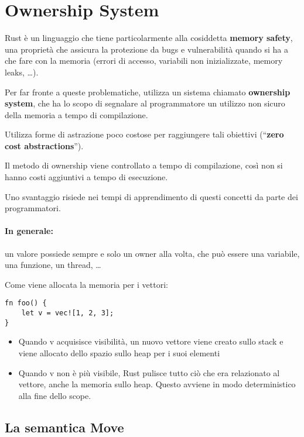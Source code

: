 \newpage
\section{Ownership System}
\label{sec:ownership}

Rust è un linguaggio che tiene particolarmente alla cosiddetta
\textbf{memory safety}, una proprietà che assicura la protezione da bugs e
vulnerabilità quando si ha a che fare con la memoria (errori di accesso,
variabili non inizializzate, memory leaks, \dots).

Per far fronte a queste problematiche, utilizza un sistema chiamato
\textbf{ownership system}, che ha lo scopo di segnalare al programmatore un
utilizzo non sicuro della memoria a tempo di compilazione.

Utilizza forme di astrazione poco costose per raggiungere tali obiettivi
(``\textbf{zero cost abstractions}'').

Il metodo di ownership viene controllato a tempo di compilazione, così non si
hanno costi aggiuntivi a tempo di esecuzione.

Uno svantaggio risiede nei tempi di apprendimento di questi concetti da parte
dei programmatori.

\paragraph{In generale:} un valore possiede sempre e solo un owner alla
volta, che può essere una variabile, una funzione, un thread, \dots

Come viene allocata la memoria per i vettori:

\begin{lstlisting}
fn foo() {
    let v = vec![1, 2, 3];
}
\end{lstlisting}

\begin{itemize}
\item Quando v acquisisce visibilità, un nuovo vettore viene creato sullo stack
e viene allocato dello spazio sullo heap per i suoi elementi
\item Quando v non è più visibile, Rust pulisce tutto ciò che era relazionato
al vettore, anche la memoria sullo heap.
Questo avviene in modo deterministico alla fine dello scope.
\end{itemize}

\subsection{La semantica Move}

